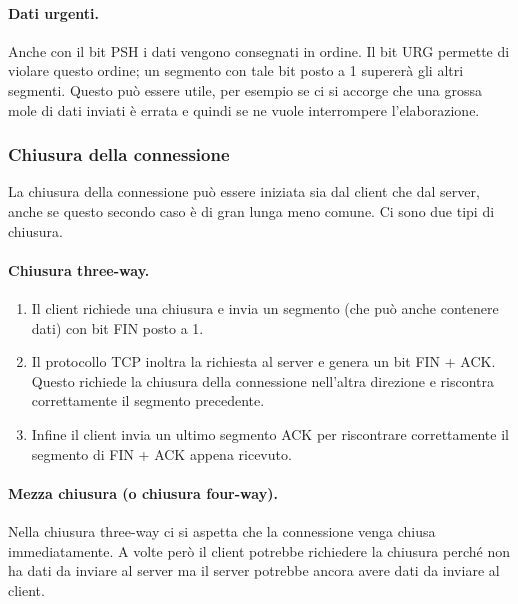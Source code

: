             \paragraph{Dati urgenti.} Anche con il bit PSH i dati vengono consegnati in ordine. Il bit URG permette di violare questo ordine; un segmento con tale bit posto a 1 supererà gli altri segmenti. Questo può essere utile, per esempio se ci si accorge che una grossa mole di dati inviati è errata e quindi se ne vuole interrompere l'elaborazione.
            
        \subsubsection{Chiusura della connessione}
            La chiusura della connessione può essere iniziata sia dal client che dal server, anche se questo secondo caso è di gran lunga meno comune. Ci sono due tipi di chiusura.
            
            \paragraph{Chiusura three-way.}
            \begin{enumerate}
                \item Il client richiede una chiusura e invia un segmento (che può anche contenere dati) con bit FIN posto a 1.
                
                \item Il protocollo TCP inoltra la richiesta al server e genera un bit FIN + ACK. Questo richiede la chiusura della connessione nell'altra direzione e riscontra correttamente il segmento precedente.
                
                \item Infine il client invia un ultimo segmento ACK per riscontrare correttamente il segmento di FIN + ACK appena ricevuto.
            \end{enumerate}
            
            \paragraph{Mezza chiusura (o chiusura four-way).} Nella chiusura three-way ci si aspetta che la connessione venga chiusa immediatamente. A volte però il client potrebbe richiedere la chiusura perché non ha dati da inviare al server ma il server potrebbe ancora avere dati da inviare al client.
            
